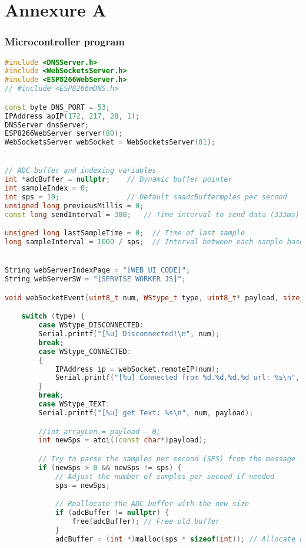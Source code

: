 \appendix
\chapter*{\centering \large Annexure A}
\subsection*{Microcontroller program}
\begin{lstlisting}[style=htmlcssjs, language=CPP]
#include <DNSServer.h>
#include <WebSocketsServer.h>
#include <ESP8266WebServer.h>
// #include <ESP8266mDNS.h>

const byte DNS_PORT = 53;
IPAddress apIP(172, 217, 28, 1);
DNSServer dnsServer;
ESP8266WebServer server(80);
WebSocketsServer webSocket = WebSocketsServer(81);


// ADC buffer and indexing variables
int *adcBuffer = nullptr;    // Dynamic buffer pointer
int sampleIndex = 0;
int sps = 10;                // Default saadcBuffermples per second
unsigned long previousMillis = 0;
const long sendInterval = 300;   // Time interval to send data (333ms)

unsigned long lastSampleTime = 0;  // Time of last sample
long sampleInterval = 1000 / sps;  // Interval between each sample based on SPS


String webServerIndexPage = "[WEB UI CODE]";
String webServerSW = "[SERVISE WORKER JS]";

void webSocketEvent(uint8_t num, WStype_t type, uint8_t* payload, size_t length) {

    switch (type) {
        case WStype_DISCONNECTED:
        Serial.printf("[%u] Disconnected!\n", num);
        break;
        case WStype_CONNECTED:
        {
            IPAddress ip = webSocket.remoteIP(num);
            Serial.printf("[%u] Connected from %d.%d.%d.%d url: %s\n", num, ip[0], ip[1], ip[2], ip[3], payload);
        }
        break;
        case WStype_TEXT:
        Serial.printf("[%u] get Text: %s\n", num, payload);

        //int arrayLen = payload - 0;
        int newSps = atoi((const char*)payload);

        // Try to parse the samples per second (SPS) from the message
        if (newSps > 0 && newSps != sps) {
            // Adjust the number of samples per second if needed
            sps = newSps;

            // Reallocate the ADC buffer with the new size
            if (adcBuffer != nullptr) {
                free(adcBuffer); // Free old buffer
            }
            adcBuffer = (int *)malloc(sps * sizeof(int)); // Allocate new buffer


\end{lstlisting}
